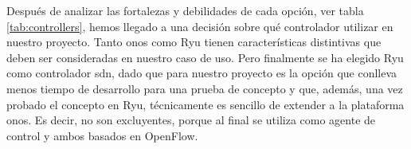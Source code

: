 \newpage



Después de analizar las fortalezas y debilidades de cada opción, ver tabla \ref{tab:controllers}, hemos llegado a una decisión sobre qué controlador utilizar en nuestro proyecto. Tanto \gls{onos} como Ryu tienen características distintivas que deben ser consideradas en nuestro caso de uso. Pero finalmente se ha elegido Ryu como controlador \gls{sdn}, dado que para nuestro proyecto es la opción que conlleva menos tiempo de desarrollo para una prueba de concepto y que, además, una vez probado el concepto en Ryu, técnicamente es sencillo de extender a la plataforma \gls{onos}. Es decir, no son excluyentes, porque al final se utiliza como agente de control y ambos basados en OpenFlow.
